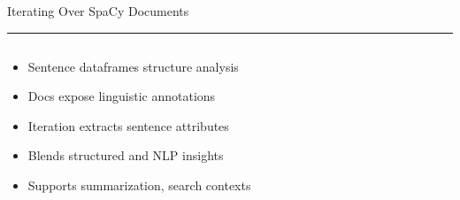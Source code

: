 \documentclass[aspectratio=169]{beamer}
\newcommand{\TitleFont}{\rmfamily}
\begin{document}
\begin{frame}[t]{}
  \vspace*{0.5cm}
  {\TitleFont\fontsize{18}{22}\selectfont\color{LUBronze}Iterating Over SpaCy Documents\par}
  \vspace{0.3em}
  {\color{LUBronze}\rule{\linewidth}{0.8pt}}\par
  \vspace{0.2cm}
  \begin{columns}[t]
    \begin{column}[t]{0.45\textwidth}
      \vspace*{0pt}
      \begin{itemize}\setlength\itemsep{0.65em}
        \item Sentence dataframes structure analysis
        \item Docs expose linguistic annotations
        \item Iteration extracts sentence attributes
        \item Blends structured and NLP insights
        \item Supports summarization, search contexts
      \end{itemize}
    \end{column}
  \end{columns}
\end{frame}
\end{document}
